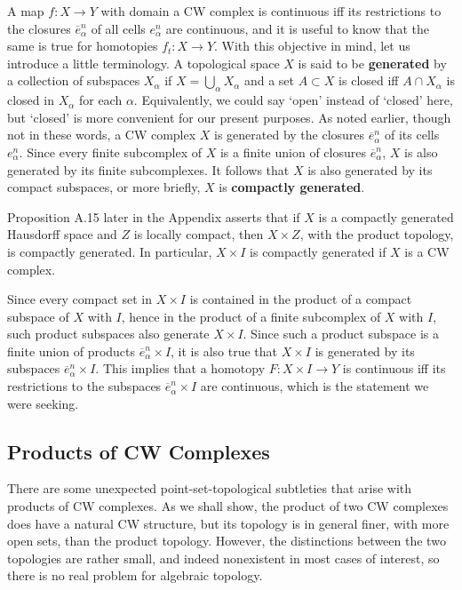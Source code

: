 \documentclass{article}
\theoremstyle{definition}
\begin{document}
A map $f: X \to Y$ with domain a CW complex is continuous iff its restrictions to the closures $\overline{e}_{\alpha}^{n}$ of all cells $e_{\alpha}^{n}$ are continuous, and it is useful to know that the same is true for homotopies $f_{t}: X \to Y$. With this objective in mind, let us introduce a little terminology. A topological space $X$ is said to be \textbf{generated} by a collection of subspaces $X_{\alpha}$ if $X = \bigcup_{\alpha} X_{\alpha}$ and a set $A \subset X$ is closed iff $A \cap X_{\alpha}$ is closed in $X_{\alpha}$ for each $\alpha$. Equivalently, we could say `open' instead of `closed' here, but `closed' is more convenient for our present purposes. As noted earlier, though not in these words, a CW complex $X$ is generated by the closures $\overline{e}_{\alpha}^{n}$ of its cells $e_{\alpha}^{n}$. Since every finite subcomplex of $X$ is a finite union of closures $\overline{e}_{\alpha}^{n}$, $X$ is also generated by its finite subcomplexes. It follows that $X$ is also generated by its compact subspaces, or more briefly, $X$ is \textbf{compactly generated}.

Proposition A.15 later in the Appendix asserts that if $X$ is a compactly generated Hausdorff space and $Z$ is locally compact, then $X \times Z$, with the product topology, is compactly generated. In particular, $X \times I$ is compactly generated if $X$ is a CW complex.

Since every compact set in $X \times I$ is contained in the product of a compact subspace of $X$ with $I$, hence in the product of a finite subcomplex of $X$ with $I$, such product subspaces also generate $X \times I$. Since such a product subspace is a finite union of products $\overline{e}_{\alpha}^{n} \times I$, it is also true that $X \times I$ is generated by its subspaces $\overline{e}_{\alpha}^{n} \times I$. This implies that a homotopy $F: X \times I \to Y$ is continuous iff its restrictions to the subspaces $\overline{e}_{\alpha}^{n} \times I$ are continuous, which is the statement we were seeking.

\subsection*{Products of CW Complexes}

There are some unexpected point-set-topological subtleties that arise with products of CW complexes. As we shall show, the product of two CW complexes does have a natural CW structure, but its topology is in general finer, with more open sets, than the product topology. However, the distinctions between the two topologies are rather small, and indeed nonexistent in most cases of interest, so there is no real problem for algebraic topology.
\end{document}
